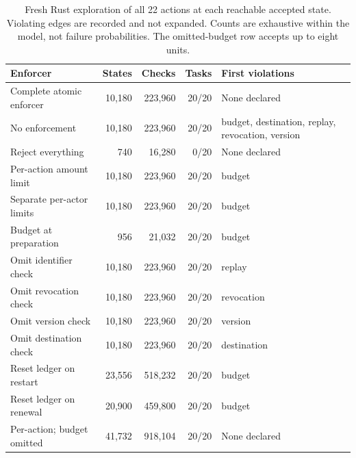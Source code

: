 \begin{table}[t]\centering\small
\begin{tabularx}{\textwidth}{@{}Lrrrl@{}}\toprule
Enforcer & States & Checks & Tasks & First violations\\\midrule
Complete atomic enforcer & 10,180 & 223,960 & 20/20 & None declared\\
No enforcement & 10,180 & 223,960 & 20/20 & budget, destination, replay, revocation, version\\
Reject everything & 740 & 16,280 & 0/20 & None declared\\
Per-action amount limit & 10,180 & 223,960 & 20/20 & budget\\
Separate per-actor limits & 10,180 & 223,960 & 20/20 & budget\\
Budget at preparation & 956 & 21,032 & 20/20 & budget\\
Omit identifier check & 10,180 & 223,960 & 20/20 & replay\\
Omit revocation check & 10,180 & 223,960 & 20/20 & revocation\\
Omit version check & 10,180 & 223,960 & 20/20 & version\\
Omit destination check & 10,180 & 223,960 & 20/20 & destination\\
Reset ledger on restart & 23,556 & 518,232 & 20/20 & budget\\
Reset ledger on renewal & 20,900 & 459,800 & 20/20 & budget\\
Per-action; budget omitted & 41,732 & 918,104 & 20/20 & None declared\\
\bottomrule\end{tabularx}
\caption{Fresh Rust exploration of all 22 actions at each reachable accepted state. Violating edges are recorded and not expanded. Counts are exhaustive within the model, not failure probabilities. The omitted-budget row accepts up to eight units.}\label{tab:results}\end{table}
